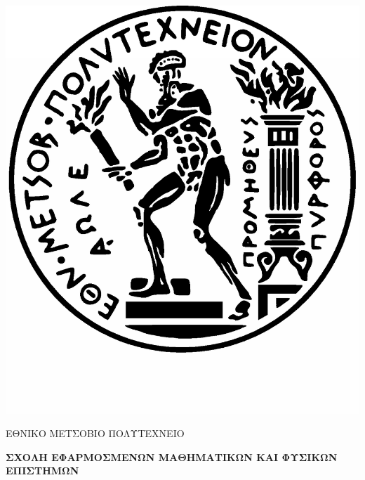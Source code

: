 \documentclass [a4paper,11pt] {book}
\theoremstyle{definition}
\theoremstyle{definition}
\begin{document}
\begin{titlepage}
\begin{center}
\includegraphics[scale=.3]{pyrforos.eps}

\Huge{Ε}\huge{ΘΝΙΚΟ} \Huge{Μ}\huge{ΕΤΣΟΒΙΟ} \Huge{Π}\huge{ΟΛΥΤΕΧΝΕΙΟ}

\textbf{\Large{Σ}\large{ΧΟΛΗ} \Large{Ε}\large{ΦΑΡΜΟΣΜΕΝΩΝ} \Large{Μ}\large{ΑΘΗΜΑΤΙΚΩΝ ΚΑΙ} \Large{Φ}\large{ΥΣΙΚΩΝ} \Large{Ε}\large{ΠΙΣΤΗΜΩΝ}}


\end{center}
\end{titlepage}
\end{document}
